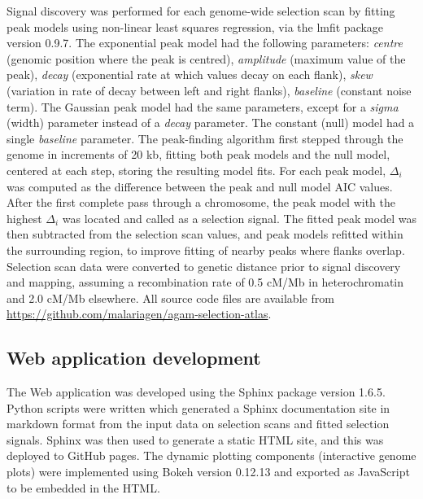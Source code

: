 \begin{refsection}
Signal discovery was performed for each genome-wide selection scan by fitting peak models using non-linear least squares regression, via the lmfit package version 0.9.7.
%
The exponential peak model had the following parameters: \textit{centre} (genomic position where the peak is centred), \textit{amplitude} (maximum value of the peak), \textit{decay} (exponential rate at which values decay on each flank), \textit{skew} (variation in rate of decay between left and right flanks), \textit{baseline} (constant noise term).
%
The Gaussian peak model had the same parameters, except for a \textit{sigma} (width) parameter instead of a \textit{decay} parameter.
%
The constant (null) model had a single \textit{baseline} parameter.
%
The peak-finding algorithm first stepped through the genome in increments of 20 kb, fitting both peak models and the null model, centered at each step, storing the resulting model fits.
%
For each peak model, $\Delta_i$ was computed as the difference between the peak and null model AIC values.
%
After the first complete pass through a chromosome, the peak model with the highest $\Delta_i$ was located and called as a selection signal.
%
The fitted peak model was then subtracted from the selection scan values, and peak models refitted within the surrounding region, to improve fitting of nearby peaks where flanks overlap.
%
Selection scan data were converted to genetic distance prior to signal discovery and mapping, assuming a recombination rate of 0.5 cM/Mb in heterochromatin and 2.0 cM/Mb elsewhere.
%
All source code files are available from \url{https://github.com/malariagen/agam-selection-atlas}.


\subsection{Web application development}\label{subsec:methods-webapp}


The Web application was developed using the Sphinx package version 1.6.5.
%
Python scripts were written which generated a Sphinx documentation site in markdown format from the input data on selection scans and fitted selection signals.
%
Sphinx was then used to generate a static HTML site, and this was deployed to GitHub pages.
%
The dynamic plotting components (interactive genome plots) were implemented using Bokeh version 0.12.13 and exported as JavaScript to be embedded in the HTML.



\end{refsection}
